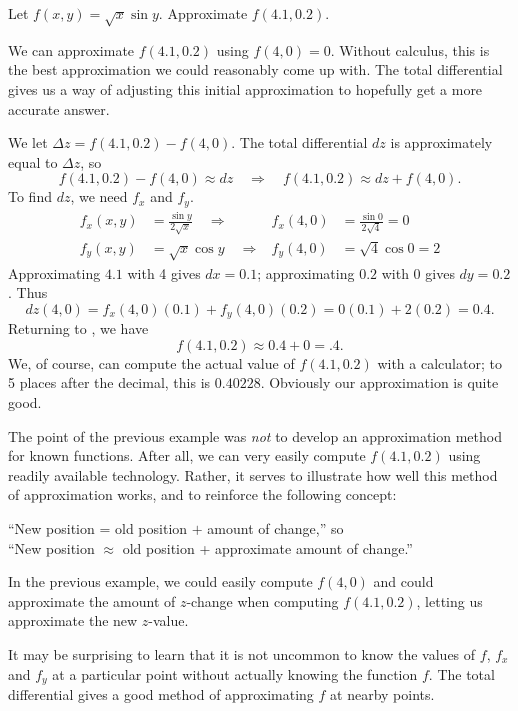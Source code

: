 {Let $f(x,y)=\sqrt{x}\sin y$. Approximate $f(4.1,0.2)$.}
{We can approximate $f(4.1,0.2)$ using $f(4,0)=0$. Without calculus, this is the best approximation we could reasonably come up with. The total differential gives us a way of adjusting this initial approximation to hopefully get a more accurate answer.

We let $\Delta z = f(4.1,0.2) - f(4,0)$. The total differential $dz$ is approximately equal to $\Delta z$, so
\begin{equation}
f(4.1,0.2) - f(4,0) \approx dz
\quad \Rightarrow \quad
f(4.1,0.2) \approx dz + f(4,0).\label{eq:totaldiff2}
\end{equation}
To find $dz$, we need $f_x$ and $f_y$.
\begin{align*}
f_x(x,y) &= \frac{\sin y}{2\sqrt{x}} \quad\Rightarrow&
f_x(4,0) &= \frac{\sin0}{2\sqrt{4}}=0 \\
f_y(x,y) &= \sqrt{x}\cos y \quad\Rightarrow&
f_y(4,0) &= \sqrt{4}\cos0=2
\end{align*}
Approximating $4.1$ with 4 gives $dx = 0.1$; approximating $0.2$ with $0$ gives $dy=0.2$. Thus
\[
dz(4,0) = f_x(4,0)(0.1) + f_y(4,0)(0.2)
=0(0.1) + 2(0.2)
=0.4.
\]
Returning to , we have
\[f(4.1,0.2) \approx 0.4 + 0 = .4.\]
We, of course, can compute the actual value of $f(4.1,0.2)$ with a calculator; to 5 places after the decimal, this is $0.40228$. Obviously our approximation is quite good.}

The point of the previous example was \textit{not} to develop an approximation method for known functions. After all, we can very easily compute $f(4.1,0.2)$ using readily available technology. Rather, it serves to illustrate how well this method of approximation works, and to reinforce the following concept:
\begin{center}
	``New position = old position $+$ amount of change,'' so\\
	``New position $\approx$ old position + approximate amount of change.''
\end{center}

In the previous example, we could easily compute $f(4,0)$ and could approximate the amount of $z$-change when computing $f(4.1,0.2)$, letting us approximate the new $z$-value.

It may be surprising to learn that it is not uncommon to know the values of $f$, $f_x$ and $f_y$ at a particular point without actually knowing the function $f$. The total differential gives a good method of approximating $f$ at nearby points.

